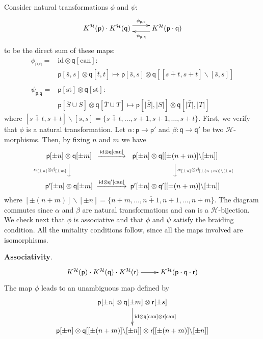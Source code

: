 \documentclass[11pt,reqno]{amsart}
\numberwithin{equation}{section}
\def\H{{\mathcal{H}}}
\def\p{{\textsf{p}}}
\def\q{{\textsf{q}}}
\def\r{{\textsf{r}}}
\def\KB{K^{\H}}
\def\pmn{\pm n}
\def\pmm{\pm m}
\def\pms{\pm s}
\def\pmmn_n{[\pm (n+m)]\backslash[\pm n]}
\def\pmmns_mn{[\pm (n+m)]\backslash[\pm n]}
\def\pmS{\pm S}
\def\pmT{\pm T}
\def\pmU{\pm U}
\def\pmSs{(\pm |S|,\sigma_0)}
\def\pmTt{(\pm |T|,\sigma_0)}
\def\pmUu{(\pm |U|,\sigma_0)}
\def\id{\mathrm{id}}
\def\can{\mathrm{can}}
\def\st{\mathrm{st}}
\def\can{\mathrm{can}}
\begin{document}
Consider natural transformations $\phi$ and $\psi$:
\begin{equation}
\xymatrix{\KB(\p)\cdot\KB(\q) \ar@<1ex>[r]^-{\phi_{\p,\q}} & \KB(\p\cdot\q) \ar@<1ex>[l]^-{\psi_{\p,\q}}}
\end{equation}
to be the direct sum of these maps:
\begin{equation}
\begin{aligned}
\phi_{\p,\q}=&\id\otimes \q[\can]:\\
&\p[\bar{s},s]\otimes \q[\bar{t},t]\mapsto
\p[\bar{s},s]\otimes \q[ [\overline{s+t},s+t]\backslash [\bar{s},s]]\\
\\
\psi_{\p,\q}=&\p[\st]\otimes \q[\st]:\\
&\p[\bar{S}\cup S]\otimes \q[\bar{T}\cup T] \mapsto
\p[\bar{|S|},|S|]\otimes \q[\bar{|T|},|T|]
\end{aligned}
\end{equation}
where $[\overline{s+t},s+t]\backslash [\bar{s},s]=\{\overline{s+t},\dots,\overline{s+1},s+1,\dots,s+t\}$.
First, we verify that $\phi$ is a natural transformation. Let $\alpha\colon \p\rightarrow\p'$ and $\beta\colon\q\rightarrow\q'$ be two $\H$-morphisms. Then, by fixing $n$ and $m$ we have
\begin{equation}
\begin{CD}
\p[\pmn]\otimes\q[\pmm] @>\id\otimes\q[\can]>> \p[\pmn]\otimes\q[\pmmn_n]\\
@V\alpha_{[\pm n]}\otimes \beta_{[\pm m]}VV @VV\alpha_{[\pm n]}\otimes \beta_{[\pm (n+m)]\backslash[\pm n]}V \\
\p'[\pmn]\otimes\q[\pmm] @>\id\otimes\q'[\can]>> \p'[\pmn]\otimes\q'[\pmmn_n]
\end{CD}
\end{equation}
where $[\pm (n+m)]\backslash[\pm n]=\{\overline{n+m},\dots,\overline{n+1},n+1,\dots,n+m\}$. The diagram commutes since $\alpha$ and $\beta$ are natural transformations and $\can$ is a $\H$-bijection.
We check next that $\phi$ is associative and that $\phi$ and $\psi$ satisfy the braiding condition. All the unitality conditions follow, since all the maps involved are isomorphisms.

{\bf Associativity}.
$$\xymatrix{\KB(\p)\cdot\KB(\q)\cdot\KB(\r) \ar[r] & \KB(\p\cdot\q\cdot\r)}$$
The map $\phi$ leads to an unambiguous map defined by
\begin{equation*}
\xymatrix{\p[\pmn]\otimes\q[\pmm]\otimes\r[\pms] \ar[d]^{\id\otimes\q[\can]\otimes\r[\can]}\\ \p[\pmn]\otimes \q[\pmmn_n]\otimes\r[\pmmns_mn]}
\end{equation*}
\end{document}
